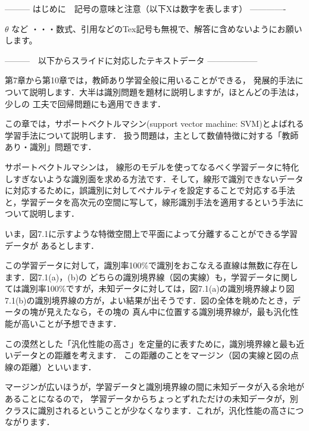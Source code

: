 --------- はじめに　記号の意味と注意（以下Xは数字を表します） -------------

$\theta$ など       ・・・数式、引用などのTex記号も無視で、解答に含めないようにお願いします。
\cite{mitchell97}

---------　以下からスライドに対応したテキストデータ ------------------


第7章から第10章では，教師あり学習全般に用いることができる，
発展的手法について説明します．大半は識別問題を題材に説明しますが，ほとんどの手法は，少しの
工夫で回帰問題にも適用できます．

この章では，サポートベクトルマシン(support vector machine: SVM)とよばれる学習手法について説明します．
扱う問題は，主として数値特徴に対する「教師あり・識別」問題です．

サポートベクトルマシンは，
線形のモデルを使ってなるべく学習データに特化しすぎないような識別面を求める方法です．そして，線形で識別できないデータに対応するために，誤識別に対してペナルティを設定することで対応する手法と，学習データを高次元の空間に写して，線形識別手法を適用するという手法について説明します．

いま，図7.1に示すような特徴空間上で平面によって分離することができる学習データが
あるとします．

この学習データに対して，識別率100\%で識別をおこなえる直線は無数に存在します．図7.1(a)，(b)の
どちらの識別境界線（図の実線）も，学習データに関しては識別率100\%ですが，未知データに対しては，図7.1(a)の識別境界線より図7.1(b)の識別境界線の方が，よい結果が出そうです．図の全体を眺めたとき，データの塊が見えたなら，その塊の
真ん中に位置する識別境界線が，最も汎化性能が高いことが予想できます．

この漠然とした「汎化性能の高さ」を定量的に表すために，識別境界線と最も近いデータとの距離を考えます．
この距離のことをマージン（図の実線と図の点線の距離）といいます．

マージンが広いほうが，学習データと識別境界線の間に未知データが入る余地があることになるので，
学習データからちょっとずれただけの未知データが，別クラスに識別されるということが少なくなります．これが，汎化性能の高さにつながります．

